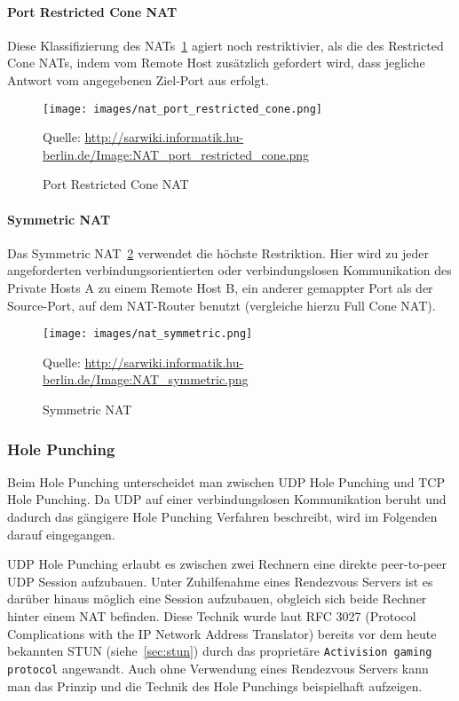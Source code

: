 \paragraph{Port Restricted Cone NAT}

Diese Klassifizierung des NATs~\ref{fig:nat-port-restricted-cone}
agiert noch restriktivier, als die des Restricted Cone NATs, indem vom
Remote Host zusätzlich gefordert wird, dass jegliche Antwort vom
angegebenen Ziel-Port aus erfolgt.

\begin{figure}
  \centering
  \texttt{[image: images/nat\_port\_restricted\_cone.png]}
  \caption{Port Restricted Cone NAT}
  \label{fig:nat-port-restricted-cone}
  \small{Quelle: \url{http://sarwiki.informatik.hu-berlin.de/Image:NAT_port_restricted_cone.png}}
\end{figure}

\paragraph{Symmetric NAT}

Das Symmetric NAT~\ref{fig:nat-sym} verwendet die höchste
Restriktion. Hier wird zu jeder angeforderten verbindungsorientierten
oder verbindungslosen Kommunikation des Private Hosts A zu einem
Remote Host B, ein anderer gemappter Port als der Source-Port, auf dem
NAT-Router benutzt (vergleiche hierzu Full Cone NAT).

\begin{figure}
  \centering
  \texttt{[image: images/nat\_symmetric.png]}
  \caption{Symmetric NAT}
  \label{fig:nat-sym}
  \small{Quelle: \url{http://sarwiki.informatik.hu-berlin.de/Image:NAT_symmetric.png}}
\end{figure}


\subsubsection{Hole Punching}
Beim Hole Punching unterscheidet man zwischen UDP Hole Punching und
TCP Hole Punching. Da UDP auf einer verbindungslosen Kommunikation
beruht und dadurch das gängigere Hole Punching Verfahren beschreibt,
wird im Folgenden darauf eingegangen.

UDP Hole Punching erlaubt es zwischen zwei Rechnern eine direkte
peer-to-peer UDP Session aufzubauen. Unter Zuhilfenahme eines
Rendezvous Servers ist es darüber hinaus möglich eine Session
aufzubauen, obgleich sich beide Rechner hinter einem NAT befinden.
Diese Technik wurde laut RFC 3027 (Protocol Complications with the IP
Network Address Translator) bereits vor dem heute bekannten STUN
(siehe~\ref{sec:stun}) durch das proprietäre \texttt{Activision gaming
  protocol} angewandt.  Auch ohne Verwendung eines Rendezvous Servers
kann man das Prinzip und die Technik des Hole Punchings beispielhaft
aufzeigen.
